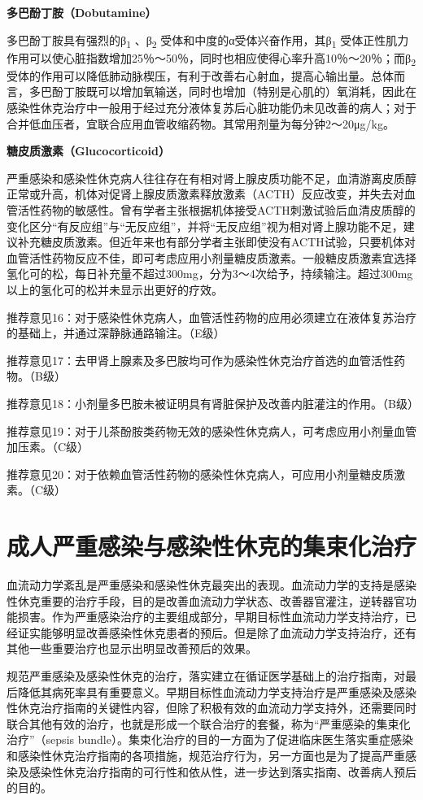 \textbf{多巴酚丁胺（Dobutamine）}

多巴酚丁胺具有强烈的β\textsubscript{1} 、β\textsubscript{2}
受体和中度的α受体兴奋作用，其β\textsubscript{1}
受体正性肌力作用可以使心脏指数增加25％～50％，同时也相应使得心率升高10％～20％；而β\textsubscript{2}
受体的作用可以降低肺动脉楔压，有利于改善右心射血，提高心输出量。总体而言，多巴酚丁胺既可以增加氧输送，同时也增加（特别是心肌的）氧消耗，因此在感染性休克治疗中一般用于经过充分液体复苏后心脏功能仍未见改善的病人；对于合并低血压者，宜联合应用血管收缩药物。其常用剂量为每分钟2～20μg/kg。

\textbf{糖皮质激素（Glucocorticoid）}

严重感染和感染性休克病人往往存在有相对肾上腺皮质功能不足，血清游离皮质醇正常或升高，机体对促肾上腺皮质激素释放激素（ACTH）反应改变，并失去对血管活性药物的敏感性。曾有学者主张根据机体接受ACTH刺激试验后血清皮质醇的变化区分“有反应组”与“无反应组”，并将“无反应组”视为相对肾上腺功能不足，建议补充糖皮质激素。但近年来也有部分学者主张即使没有ACTH试验，只要机体对血管活性药物反应不佳，即可考虑应用小剂量糖皮质激素。一般糖皮质激素宜选择氢化可的松，每日补充量不超过300mg，分为3～4次给予，持续输注。超过300mg以上的氢化可的松并未显示出更好的疗效。

推荐意见16：对于感染性休克病人，血管活性药物的应用必须建立在液体复苏治疗的基础上，并通过深静脉通路输注。（E级）

推荐意见17：去甲肾上腺素及多巴胺均可作为感染性休克治疗首选的血管活性药物。（B级）

推荐意见18：小剂量多巴胺未被证明具有肾脏保护及改善内脏灌注的作用。（B级）

推荐意见19：对于儿茶酚胺类药物无效的感染性休克病人，可考虑应用小剂量血管加压素。（C级）

推荐意见20：对于依赖血管活性药物的感染性休克病人，可应用小剂量糖皮质激素。（C级）

\section{成人严重感染与感染性休克的集束化治疗}

血流动力学紊乱是严重感染和感染性休克最突出的表现。血流动力学的支持是感染性休克重要的治疗手段，目的是改善血流动力学状态、改善器官灌注，逆转器官功能损害。作为严重感染治疗的主要组成部分，早期目标性血流动力学支持治疗，已经证实能够明显改善感染性休克患者的预后。但是除了血流动力学支持治疗，还有其他一些重要治疗也显示出明显改善预后的效果。

规范严重感染及感染性休克的治疗，落实建立在循证医学基础上的治疗指南，对最后降低其病死率具有重要意义。早期目标性血流动力学支持治疗是严重感染及感染性休克治疗指南的关键性内容，但除了积极有效的血流动力学支持外，还需要同时联合其他有效的治疗，也就是形成一个联合治疗的套餐，称为“严重感染的集束化治疗”（sepsis
bundle）。集束化治疗的目的一方面为了促进临床医生落实重症感染和感染性休克治疗指南的各项措施，规范治疗行为，另一方面也是为了提高严重感染及感染性休克治疗指南的可行性和依从性，进一步达到落实指南、改善病人预后的目的。

